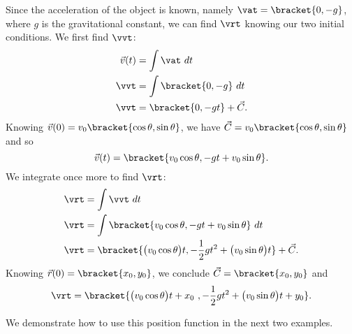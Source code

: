 Since the acceleration of the object is known, namely $\vat =\bracket{0,-g}$, where $g$ is the gravitational constant, we can find $\vrt$ knowing our two initial conditions. We first find $\vvt$:
\begin{align*}
\vec v(t) &= \int \vat \ dt\\
\vvt &= \int\bracket{0,-g}\ dt\\
\vvt &=\bracket{0,-gt}+ \vec C.
\end{align*}
Knowing $\vec v(0) = v_0\bracket{\cos \theta,\sin \theta}$, we have $\vec C = v_0\bracket{\cos\theta,\sin\theta}$ and so
\[\vec v(t) =\bracket{v_0\cos \theta, -gt+v_0\sin\theta}.\]
We integrate once more to find $\vrt$:
\begin{align*}
\vrt &= \int \vvt\ dt \\
\vrt &= \int\bracket{v_0\cos \theta, -gt+v_0\sin\theta}\ dt\\
\vrt &=\bracket{\bigl(v_0\cos \theta\bigr)t, -\frac12gt^2+\bigl(v_0\sin\theta\bigr)t}+ \vec C.
\end{align*}
Knowing $\vec r(0) =\bracket{x_0,y_0}$, we conclude $\vec C =\bracket{x_0,y_0}$ and
\begin{equation}
\vrt
=\bracket{\bigl(v_0\cos\theta\bigr)t+x_0\ ,-\frac12gt^2+\bigl(v_0\sin\theta\bigr)t+y_0}.
\label{idea:projectile}
\end{equation}


We demonstrate how to use this position function in the next two examples.


